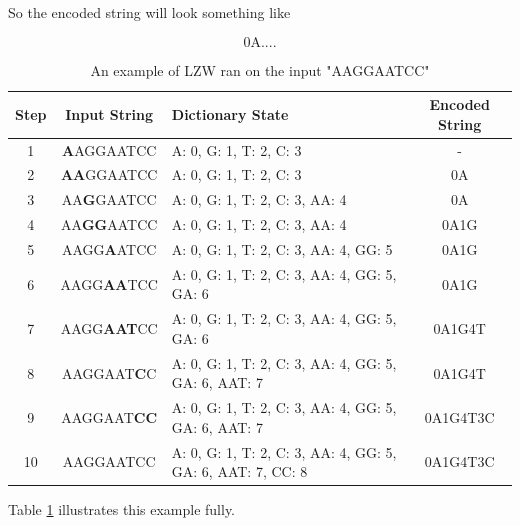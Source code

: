 \documentclass[12pt,twoside]{reedthesis}
\begin{document}
So the encoded string will look something like

\[\text{0A....}\]
\begin{table}
\begin{tabular}{ | c | c | p{} | c | }
\hline
\textbf{Step} & \textbf{Input String} & \textbf{Dictionary State} & \textbf{Encoded String} \\
\hline
1 & \textbf{A}AGGAATCC & {A: 0, G: 1, T: 2, C: 3} & - \\
\hline
2 & \textbf{AA}GGAATCC & {A: 0, G: 1, T: 2, C: 3} & 0A \\
\hline
3 & AA\textbf{G}GAATCC & {A: 0, G: 1, T: 2, C: 3, AA: 4} & 0A  \\
\hline
4 & AA\textbf{GG}AATCC & {A: 0, G: 1, T: 2, C: 3, AA: 4} & 0A1G   \\
\hline
5 & AAGG\textbf{A}ATCC & {A: 0, G: 1, T: 2, C: 3, AA: 4, GG: 5} & 0A1G \\
\hline
6 & AAGG\textbf{AA}TCC & {A: 0, G: 1, T: 2, C: 3, AA: 4, GG: 5, GA: 6} & 0A1G  \\
\hline
7 & AAGG\textbf{AAT}CC & {A: 0, G: 1, T: 2, C: 3, AA: 4, GG: 5, GA: 6} & 0A1G4T  \\
\hline
8 & AAGGAAT\textbf{C}C & {A: 0, G: 1, T: 2, C: 3, AA: 4, GG: 5, GA: 6, AAT: 7} & 0A1G4T \\
\hline
9 & AAGGAAT\textbf{CC} & {A: 0, G: 1, T: 2, C: 3, AA: 4, GG: 5, GA: 6, AAT: 7} & 0A1G4T3C \\
\hline
10 & AAGGAATCC & {A: 0, G: 1, T: 2, C: 3, AA: 4, GG: 5, GA: 6, AAT: 7, CC: 8} & 0A1G4T3C \\
\hline
\end{tabular}
\caption{ An example of LZW ran on the input "AAGGAATCC"}
\label{tab:lzwexample}
\end{table}
Table \ref{tab:lzwexample} illustrates this example fully.
\end{document}
